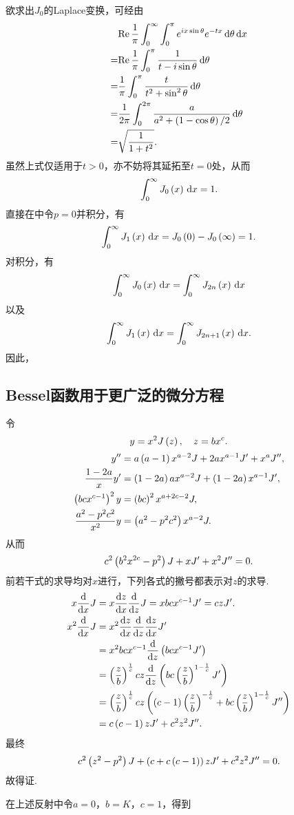 \documentclass[UTF-8]{ctexart}
\begin{document}
  欲求出$J_0$的Laplace变换，可经由
  \begin{align*}
    &\text{Re}\, \frac{1}{\pi}\int_0^\infty \int_0^{\pi} e^{ix\sin\theta}e^{-tx} \,\mathrm{d} \theta \, \mathrm{d} x\\
    =&\text{Re}\, \frac{1}{\pi}\int_0^{\pi} \frac{1}{t-i\sin\theta} \,\mathrm{d} \theta\\
    =& \frac{1}{\pi}\int_0^{\pi} \frac{t}{t^2+\sin^2\theta} \,\mathrm{d} \theta\\
    =& \frac{1}{2\pi}\int_0^{2\pi} \frac{a}{a^2+\left(1-\cos\theta\right)/2} \,\mathrm{d} \theta\\
    =& \sqrt{\frac{1}{1+t^2}}.
  \end{align*}
  虽然上式仅适用于$t>0$，亦不妨将其延拓至$t=0$处，从而
  \[ \int_0^\infty J_0\left(x\right) \, \mathrm{d} x = 1. \]
  直接在中令$p=0$并积分，有
  \[ \int_0^\infty J_1\left(x\right) \, \mathrm{d} x = J_0\left(0\right) - J_0\left(\infty\right) = 1. \]
  对积分，有
  \[ \int_0^\infty J_0\left(x\right) \, \mathrm{d} x = \int_0^\infty J_{2n}\left(x\right) \, \mathrm{d} x \]
  以及
  \[ \int_0^\infty J_1\left(x\right) \, \mathrm{d} x = \int_0^\infty J_{2n+1}\left(x\right) \, \mathrm{d} x. \]
  因此，
  \subsection{Bessel函数用于更广泛的微分方程}
	令
	\[ y=x^2J\left(z\right),\quad z=bx^c. \]
	\begin{align*}
	  y'' &= a\left(a-1\right)x^{a-2}J+2ax^{a-1}J'+x^aJ'',\\
	  \frac{1-2a}{x}y' &= \left(1-2a\right)ax^{a-2}J+\left(1-2a\right)x^{a-1}J',\\
	  \left(bcx^{c-1}\right)^2y &=\left(bc\right)^2x^{a+2c-2}J,\\
	  \frac{a^2-p^2c^2}{x^2}y &=\left(a^2-p^2c^2\right)x^{a-2}J.\\
	\end{align*}
	从而
	\[ c^2\left(b^2x^{2c}-p^2\right)J+xJ'+x^2J'' = 0. \]
	前若干式的求导均对$x$进行，下列各式的撇号都表示对$z$的求导.
	\begin{align*}
	  x\frac{\mathrm{d} }{\mathrm{d} x}J &= x \frac{\mathrm{d} z}{\mathrm{d} x} \frac{\mathrm{d} }{\mathrm{d} z}J = xbcx^{c-1}J' = czJ'.\\
	  x^2\frac{\mathrm{d}}{\mathrm{d} x}{J} &= x^2 \frac{\mathrm{d} z}{\mathrm{d} x}\frac{\mathrm{d} }{\mathrm{d} z}\frac{\mathrm{d} z}{\mathrm{d} x}J' \\
	  &= x^2bcx^{c-1}\frac{\mathrm{d} }{\mathrm{d} z}\left(bcx^{c-1}J'\right) \\
	  &= \left(\frac{z}{b}\right)^{\frac{1}{c}}cz\frac{\mathrm{d} }{\mathrm{d} z}\left(bc\left(\frac{z}{b}\right)^{1-\frac{1}{c}}J'\right)\\
	  &=\left(\frac{z}{b}\right)^{\frac{1}{c}}cz\left(\left(c-1\right)\left(\frac{z}{b}\right)^{-\frac{1}{c}}+bc\left(\frac{z}{b}\right)^{1-\frac{1}{c}}J''\right)\\
	  &= c\left(c-1\right)zJ'+c^2z^2J''.
	\end{align*}
	最终
	\[ c^2\left(z^2-p^2\right)J+\left(c+c\left(c-1\right)\right)zJ'+c^2z^2J''=0. \]
	故得证.
	\par
	在上述反射中令$a=0$，$b=K$，$c=1$，得到
\end{document}
